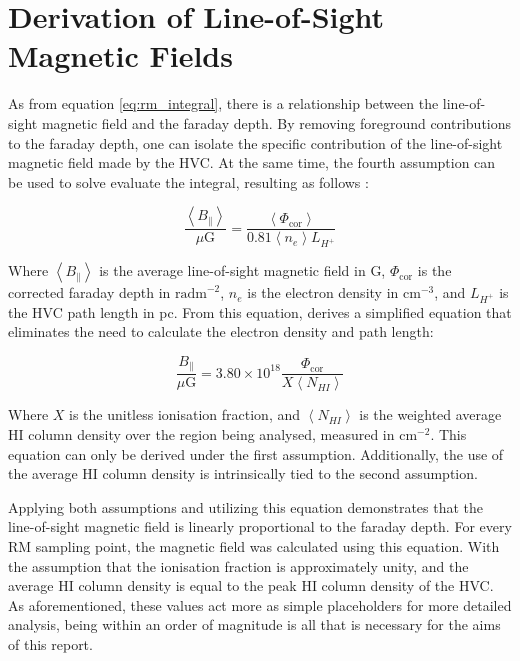 \section{Derivation of Line-of-Sight Magnetic Fields}
\label{sec:los_dev}

As from equation \ref{eq:rm_integral}, there is a relationship between the line-of-sight magnetic field and the faraday depth. By removing foreground contributions to the faraday depth, one can isolate the specific contribution of the line-of-sight magnetic field made by the HVC. At the same time, the fourth assumption can be used to solve evaluate the integral, resulting as follows \citep{ID26}:


\begin{equation}
    \frac{\left<B_{\parallel}\right>}{\mu\mathrm{G}}=\frac{\left<\Phi_{\mathrm{cor}}\right>}{0.81\left<n_e\right>L_{H^+}}
\label{eq:B_intermediate}
\end{equation}


Where $\left<B_{\parallel}\right>$ is the average line-of-sight magnetic field in \textmu G, $\Phi_{\mathrm{cor}}$ is the corrected faraday depth in $\mathrm{rad m}^{-2}$, $n_e$ is the electron density in $\mathrm{cm}^{-3}$, and $L_{H^+}$ is the HVC path length in pc. From this equation, \cite{ID27} derives a simplified equation that eliminates the need to calculate the electron density and path length:


\begin{equation}
    \frac{B_{\parallel}}{\mu\mathrm{G}}=3.80\times10^{18}\frac{\Phi_{\mathrm{cor}}}{X\left<N_{HI}\right>}
\label{eq:the_equation}
\end{equation}


Where $X$ is the unitless ionisation fraction, and $\left<N_{HI}\right>$ is the weighted average HI column density over the region being analysed, measured in $\mathrm{cm}^{-2}$. This equation can only be derived under the first assumption. Additionally, the use of the average HI column density is intrinsically tied to the second assumption.


Applying both assumptions and utilizing this equation demonstrates that the line-of-sight magnetic field is linearly proportional to the faraday depth. For every RM sampling point, the magnetic field was calculated using this equation. With the assumption that the ionisation fraction is approximately unity, and the average HI column density is equal to the peak HI column density of the HVC. As aforementioned, these values act more as simple placeholders for more detailed analysis, being within an order of magnitude is all that is necessary for the aims of this report.


